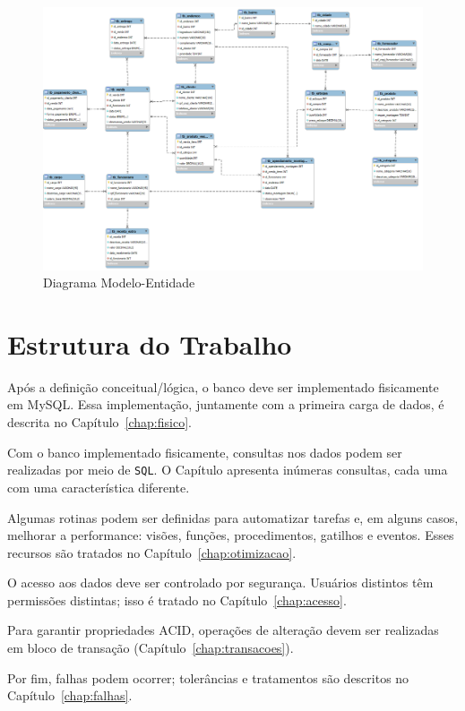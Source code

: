 \documentclass[
12pt,
a4paper,
semrecuonosumario,
sumario = abnt-6027-2012]{report}
\begin{document}
    \begin{figure}[H]
      \centering
      \includegraphics[width=.9\textwidth]{figuras/01-bdConceitualLog/mer.png}
      \caption{Diagrama Modelo-Entidade}
      \label{fig:mer}
    \end{figure}

    \section{Estrutura do Trabalho}\label{sec:EstruturaTrabalho}
    Após a definição conceitual/lógica, o banco deve ser implementado fisicamente em MySQL.
    Essa implementação, juntamente com a primeira carga de dados, é descrita no Capítulo~\ref{chap:fisico}.

    Com o banco implementado fisicamente, consultas nos dados podem ser realizadas por meio de \texttt{SQL}.
    O Capítulo apresenta inúmeras consultas, cada uma com uma característica diferente.

    Algumas rotinas podem ser definidas para automatizar tarefas e, em alguns casos, melhorar a performance:
    visões, funções, procedimentos, gatilhos e eventos. Esses recursos são tratados no Capítulo~\ref{chap:otimizacao}.

    O acesso aos dados deve ser controlado por segurança. Usuários distintos têm permissões distintas; isso é tratado no Capítulo~\ref{chap:acesso}.

    Para garantir propriedades ACID, operações de alteração devem ser realizadas em bloco de transação (Capítulo~\ref{chap:transacoes}).

    Por fim, falhas podem ocorrer; tolerâncias e tratamentos são descritos no Capítulo~\ref{chap:falhas}.
\end{document}
